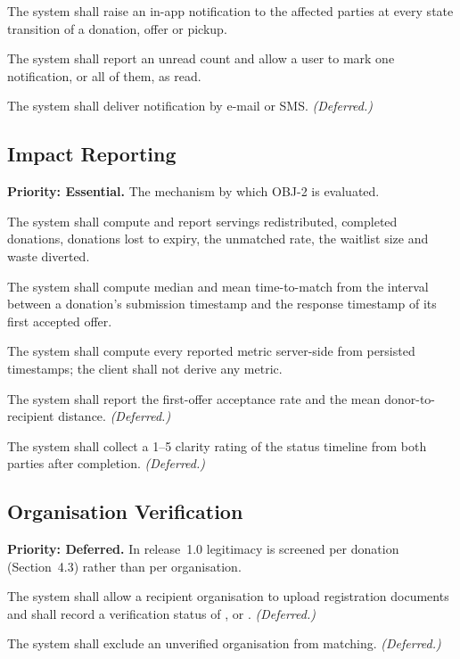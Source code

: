 \documentclass[11pt,a4paper]{article}
\newcommand{\code}[1]{\texttt{\detokenize{#1}}}
\newcommand{\req}[2]{\item[\textbf{#1}] #2}
\begin{document}
\begin{description}[leftmargin=1.6cm,style=nextline,font=\normalfont\bfseries]
  \req{FR-42}{The system shall raise an in-app notification to the affected
    parties at every state transition of a donation, offer or pickup.}
  \req{FR-43}{The system shall report an unread count and allow a user to mark
    one notification, or all of them, as read.}
  \req{FR-44}{The system shall deliver notification by e-mail or SMS.
    \textit{(Deferred.)}}
\end{description}

\subsection{Impact Reporting}
\textbf{Priority: Essential.} The mechanism by which OBJ-2 is evaluated.

\begin{description}[leftmargin=1.6cm,style=nextline,font=\normalfont\bfseries]
  \req{FR-45}{The system shall compute and report servings redistributed,
    completed donations, donations lost to expiry, the unmatched rate, the
    waitlist size and waste diverted.}
  \req{FR-46}{The system shall compute median and mean time-to-match from the
    interval between a donation's submission timestamp and the response
    timestamp of its first accepted offer.}
  \req{FR-47}{The system shall compute every reported metric server-side from
    persisted timestamps; the client shall not derive any metric.}
  \req{FR-48}{The system shall report the first-offer acceptance rate and the
    mean donor-to-recipient distance. \textit{(Deferred.)}}
  \req{FR-49}{The system shall collect a 1--5 clarity rating of the status
    timeline from both parties after completion. \textit{(Deferred.)}}
\end{description}

\subsection{Organisation Verification}
\textbf{Priority: Deferred.} In release~1.0 legitimacy is screened per donation
(Section~4.3) rather than per organisation.

\begin{description}[leftmargin=1.6cm,style=nextline,font=\normalfont\bfseries]
  \req{FR-50}{The system shall allow a recipient organisation to upload
    registration documents and shall record a verification status of
    \code{PENDING}, \code{APPROVED} or \code{REJECTED}. \textit{(Deferred.)}}
  \req{FR-51}{The system shall exclude an unverified organisation from matching.
    \textit{(Deferred.)}}
\end{description}
\end{document}
